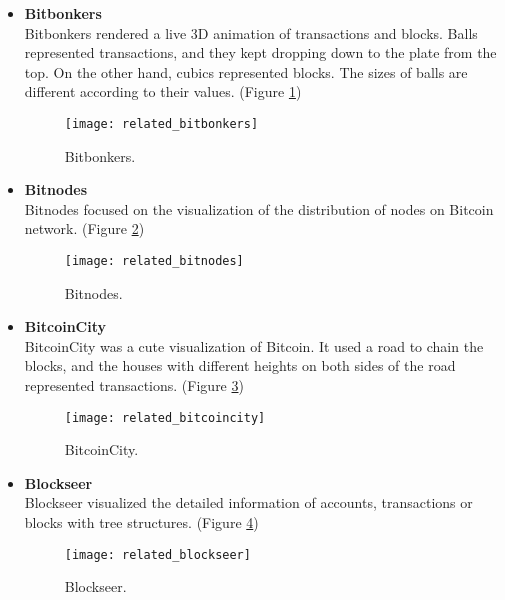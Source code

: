 \begin{itemize}
    \item \textbf{Bitbonkers} \cite{bitbonkers} \\
        Bitbonkers rendered a live 3D animation of transactions and blocks. Balls represented transactions, and they kept dropping down to the plate from the top. On the other hand, cubics represented blocks. The sizes of balls are different according to their values. (Figure \ref{fig:bitbonkers})
        \begin{figure}[htb]
            \centering
            \texttt{[image: related\_bitbonkers]}
            \caption{Bitbonkers.}
            \label{fig:bitbonkers}
        \end{figure}
    \item \textbf{Bitnodes} \cite{bitnodes} \\
        Bitnodes focused on the visualization of the distribution of nodes on Bitcoin network. (Figure \ref{fig:bitnodes})
        \begin{figure}[htb]
            \centering
            \texttt{[image: related\_bitnodes]}
            \caption{Bitnodes.}
            \label{fig:bitnodes}
        \end{figure}
    \clearpage
    \vspace*{\fill}
    \item \textbf{BitcoinCity} \cite{bitcoincity} \\
        BitcoinCity was a cute visualization of Bitcoin. It used a road to chain the blocks, and the houses with different heights on both sides of the road represented transactions. (Figure \ref{fig:bitcoincity})
        \begin{figure}[htb]
            \centering
            \texttt{[image: related\_bitcoincity]}
            \caption{BitcoinCity.}
            \label{fig:bitcoincity}
        \end{figure}
    \item \textbf{Blockseer} \cite{blockseer} \\
        Blockseer visualized the detailed information of accounts, transactions or blocks with tree structures. (Figure \ref{fig:blockseer})
        \begin{figure}[htb]
            \centering
            \texttt{[image: related\_blockseer]}
            \caption{Blockseer.}
            \label{fig:blockseer}
        \end{figure}
    \vspace*{\fill}

\end{itemize}

